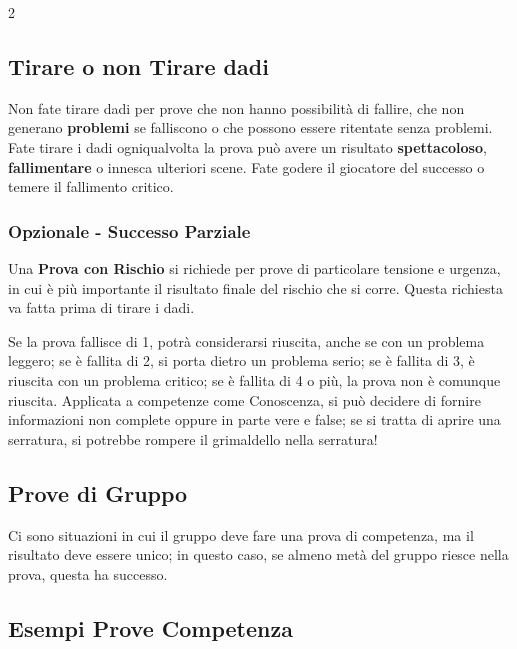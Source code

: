 \begin{multicols}{2}
\subsection{Tirare o non Tirare dadi}\label{tirarenontiraredadi}

Non fate tirare dadi per prove che non hanno possibilità di fallire, che non generano \textbf{problemi} se falliscono o che possono essere ritentate senza problemi. Fate tirare i dadi ogniqualvolta la prova può avere un risultato \textbf{spettacoloso}, \textbf{fallimentare} o innesca ulteriori scene. Fate godere il giocatore del successo o temere il fallimento critico.

\subsubsection{Opzionale - Successo Parziale}\hypertarget{successoparziale}{}\label{successoparziale}

Una \textbf{Prova con Rischio} si richiede per prove di particolare tensione e urgenza, in cui è più importante il risultato finale del rischio che si corre. Questa richiesta va fatta prima di tirare i dadi.

Se la prova fallisce di 1, potrà considerarsi riuscita, anche se con un problema leggero; se è fallita di 2, si porta dietro un problema serio; se è fallita di 3, è riuscita con un problema critico; se è fallita di 4 o più, la prova non è comunque riuscita. Applicata a competenze come Conoscenza, si può decidere di fornire informazioni non complete oppure in parte vere e false; se si tratta di aprire una serratura, si potrebbe rompere il grimaldello nella serratura!

\subsection{Prove di Gruppo}\label{provedigruppo}\hypertarget{provedigruppo}{}

Ci sono situazioni in cui il gruppo deve fare una prova di competenza, ma il risultato deve essere unico; in questo caso, se almeno metà del gruppo riesce nella prova, questa ha successo.

\subsection{Esempi Prove Competenza}\label{esempiprovecompetenza}\hypertarget{esempiprovecompetenze}{}


\end{multicols}

